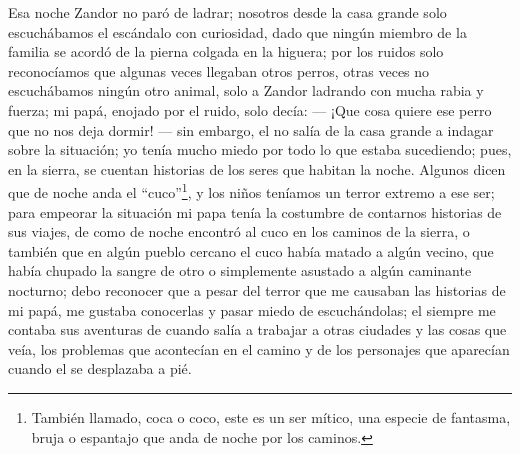 Esa noche Zandor no paró de ladrar; nosotros desde la casa grande solo escuchábamos el escándalo con curiosidad, dado que ningún miembro de la familia se acordó de la pierna colgada en la higuera; por los ruidos solo reconocíamos que algunas veces llegaban otros perros, otras veces no escuchábamos ningún otro animal, solo a Zandor ladrando con mucha rabia y fuerza; mi papá, enojado por el ruido, solo decía: 
--- ¡Que cosa quiere ese perro que no nos deja dormir! --- sin embargo, el no salía de la casa grande a indagar sobre la situación; yo tenía mucho miedo por todo lo que estaba sucediendo; pues, en la sierra, se cuentan historias de los seres que habitan la noche.
Algunos dicen que de noche anda el ``cuco''\footnote{También llamado, coca o coco, este es un ser mítico, una especie de fantasma, bruja o espantajo que anda de noche por los caminos.}, y los niños teníamos un terror extremo a ese ser; para empeorar la situación mi papa tenía la costumbre de contarnos historias de sus viajes, de como de noche encontró al cuco en los caminos de la sierra, o también que en algún pueblo cercano el cuco había matado a algún vecino, que había chupado la sangre de otro o simplemente asustado a algún caminante nocturno; debo reconocer que a pesar del terror que me causaban las historias de mi papá, me gustaba conocerlas y pasar miedo de escuchándolas; el siempre me contaba sus aventuras de cuando salía a trabajar a otras ciudades y las cosas que veía, los problemas que acontecían en el camino y de los personajes que aparecían cuando el se desplazaba a pié.

